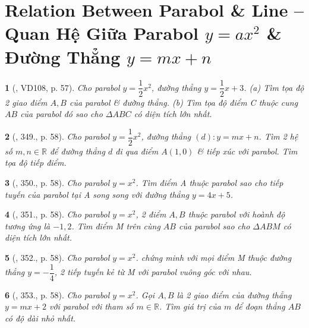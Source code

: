 \documentclass{article}
\newtheorem{baitoan}{}
\begin{document}

\section{Relation Between Parabol \& Line -- Quan Hệ Giữa Parabol $y = ax^2$ \& Đường Thẳng $y = mx + n$}

\begin{baitoan}[\cite{Binh_Toan_9_tap_2}, VD108, p. 57]
	Cho parabol $y = \dfrac{1}{2}x^2$, đường thẳng $y = \dfrac{1}{2}x + 3$. (a) Tìm tọa độ 2 giao điểm $A,B$ của parabol \& đường thẳng. (b) Tìm tọa độ điểm C thuộc cung $AB$ của parabol đó sao cho $\Delta ABC$ có diện tích lớn nhất.
\end{baitoan}

\begin{baitoan}[\cite{Binh_Toan_9_tap_2}, 349., p. 58]
	Cho parabol $y = \dfrac{1}{2}x^2$, đường thẳng $(d):y = mx + n$. Tìm 2 hệ số $m,n\in\mathbb{R}$ để đường thẳng $d$ đi qua điểm $A(1,0)$ \& tiếp xúc với parabol. Tìm tọa độ tiếp điểm.
\end{baitoan}

\begin{baitoan}[\cite{Binh_Toan_9_tap_2}, 350., p. 58]
	Cho parabol $y = x^2$. Tìm điểm A thuộc parabol sao cho tiếp tuyến của parabol tại A song song với đường thẳng $y = 4x + 5$.
\end{baitoan}

\begin{baitoan}[\cite{Binh_Toan_9_tap_2}, 351., p. 58]
	Cho parabol $y = x^2$, 2 điểm $A,B$ thuộc parabol với hoành độ tương ứng là $-1,2$. Tìm điểm M trên cùng $AB$ của parabol sao cho $\Delta ABM$ có diện tích lớn nhất.
\end{baitoan}

\begin{baitoan}[\cite{Binh_Toan_9_tap_2}, 352., p. 58]
	Cho parabol $y = x^2$. chứng minh với mọi điểm M thuộc đường thẳng $y = -\dfrac{1}{4}$, 2 tiếp tuyến kẻ từ M với parabol vuông góc với nhau.
\end{baitoan}

\begin{baitoan}[\cite{Binh_Toan_9_tap_2}, 353., p. 58]
	Cho parabol $y = x^2$. Gọi $A,B$ là 2 giao điểm của đường thẳng $y = mx + 2$ với parabol với tham số $m\in\mathbb{R}$. Tìm giá trị của $m$ để đoạn thẳng $AB$ có độ dài nhỏ nhất.
\end{baitoan}

\end{document}
